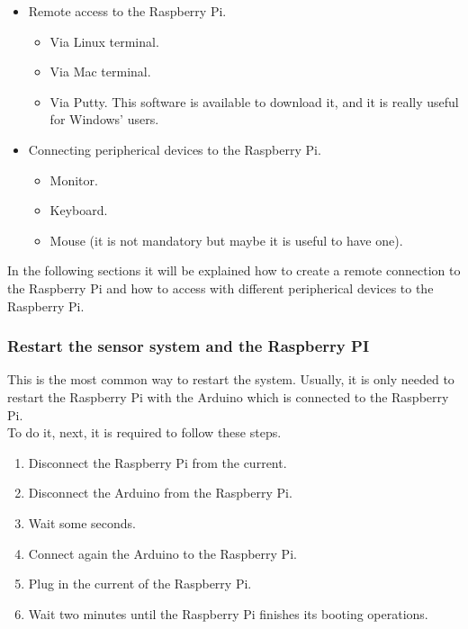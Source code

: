 \begin{itemize}
\item Remote access to the Raspberry Pi.
\begin{itemize}
\item Via Linux terminal.
\item Via Mac terminal.
\item Via Putty. This software is available to download it, and it is really useful for Windows’ users.
\end{itemize}
\item Connecting peripherical devices to the Raspberry Pi.
\begin{itemize}
\item Monitor.
\item Keyboard.
\item Mouse (it is not mandatory but maybe it is useful to have one).
\end{itemize}
\end{itemize}

In the following sections it will be explained how to create a remote connection to the Raspberry Pi and how to access with different peripherical devices to the Raspberry Pi.\\

\subsubsection{Restart the sensor system and the Raspberry PI}

This is the most common way to restart the system. Usually, it is only needed to restart the Raspberry Pi with the Arduino which is connected to the Raspberry Pi.\\

To do it, next, it is required to follow these steps.

\begin{enumerate}

\item Disconnect the Raspberry Pi from the current.
\item Disconnect the Arduino from the Raspberry Pi.
\item Wait some seconds.
\item Connect again the Arduino to the Raspberry Pi.
\item Plug in the current of the Raspberry Pi.
\item Wait two minutes until the Raspberry Pi finishes its booting operations.

\end{enumerate}

